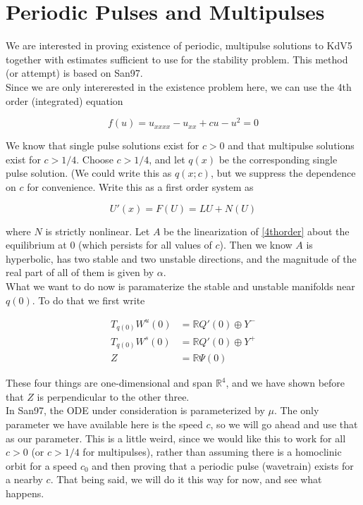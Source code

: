 \documentclass[12pt]{article}
\def\R{{\mathbb R}}
\begin{document}
\section{Periodic Pulses and Multipulses}

We are interested in proving existence of periodic, multipulse solutions to KdV5 together with estimates sufficient to use for the stability problem. This method (or attempt) is based on San97.\\

Since we are only intererested in the existence problem here, we can use the 4th order (integrated) equation

\begin{equation}\label{4thorder}
f(u) = u_{xxxx} - u_{xx} + c u - u^2 = 0
\end{equation}

We know that single pulse solutions exist for $c > 0$ and that multipulse solutions exist for $c > 1/4$. Choose $c > 1/4$, and let $q(x)$ be the corresponding single pulse solution. (We could write this as $q(x; c)$, but we suppress the dependence on $c$ for convenience. Write this as a first order system as

\[
U'(x) = F(U) = LU + N(U)
\]

where $N$ is strictly nonlinear. Let $A$ be the linearization of \eqref{4thorder} about the equilibrium at 0 (which persists for all values of $c$). Then we know $A$ is hyperbolic, has two stable and two unstable directions, and the magnitude of the real part of all of them is given by $\alpha$. 
\\

What we want to do now is paramaterize the stable and unstable manifolds near $q(0)$. To do that we first write

\begin{align*}
T_{q(0)}W^u(0) &= \R Q'(0) \oplus Y^- \\
T_{q(0)}W^s(0) &= \R Q'(0) \oplus Y^+ \\
Z &= \R \Psi(0)
\end{align*}

These four things are one-dimensional and span $\R^4$, and we have shown before that $Z$ is perpendicular to the other three. \\

In San97, the ODE under consideration is parameterized by $\mu$. The only parameter we have available here is the speed $c$, so we will go ahead and use that as our parameter. This is a little weird, since we would like this to work for all $c > 0$ (or $c > 1/4$ for multipulses), rather than assuming there is a homoclinic orbit for a speed $c_0$ and then proving that a periodic pulse (wavetrain) exists for a nearby $c$. That being said, we will do it this way for now, and see what happens.\\
\end{document}
